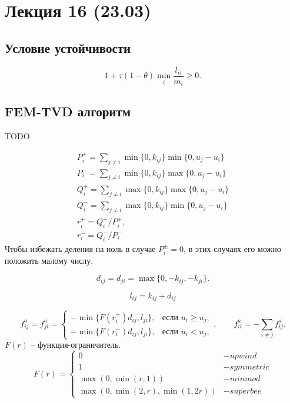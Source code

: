 \section{Лекция 16 (23.03)}

\subsection{Условие устойчивости}
\begin{equation}
\label{eq:femtvd_tau}
1 + \tau(1 - \theta)\min_i\frac{l_{ii}}{m_i} \geq 0.
\end{equation}
\subsection{FEM-TVD алгоритм}
TODO

\begin{equation}
\begin{array}{l}
P_i^{+} = \sum\limits_{j\neq i}\min\{0, k_{ij}\}\min\{0, u_j - u_i\}\\
P_i^{-} = \sum\limits_{j\neq i}\min\{0, k_{ij}\}\max\{0, u_j - u_i\}\\
Q_i^{+} = \sum\limits_{j\neq i}\max\{0, k_{ij}\}\max\{0, u_j - u_i\}\\
Q_i^{-} = \sum\limits_{j\neq i}\max\{0, k_{ij}\}\min\{0, u_j - u_i\}\\
r_i^{+} = Q_i^{+} / P_i^{+},\\
r_i^{-} = Q_i^{-} / P_i^{-}
\end{array}
\end{equation}
Чтобы избежать деления на ноль в случае $P_i^{\pm} = 0$, в этих случаях его можно положить малому числу.

\begin{equation}
d_{ij} = d_{ji} = \max\{0, -k_{ij}, -k_{ji}\}.
\end{equation}

\begin{equation}
l_{ij} = k_{ij} + d_{ij}
\end{equation}

\begin{equation}
\label{femtvd_fa}
f_{ij}^a = f_{ji}^a = \begin{cases}
-\min\{ F(r_i^+) d_{ij}, l_{ji} \}, &\text{если } u_i \geq u_j,\\
-\min\{ F(r_i^-) d_{ij}, l_{ji} \}, &\text{если } u_i < u_j,
\end{cases},
\qquad f^a_{ii} = -\sum\limits_{i\neq j} f^a_{ij}.
\end{equation}
$F(r)$ -- функция-ограничитель.
\begin{equation}
F(r) = \left\{
\begin{array}{ll}
0 & - upwind\\
1 & - symmetric \\
\max(0, \min(r, 1)) & - minmod\\
\max(0, \min(2, r), \min(1, 2 r))   & - superbee
\end{array}
\right.
\end{equation}

